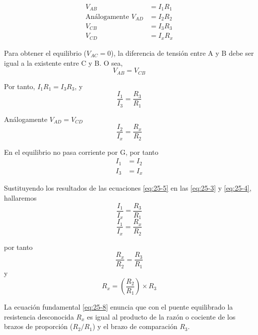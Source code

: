 \documentclass{article}
\numberwithin{equation}{subsection}
\numberwithin{figure}{section}
\numberwithin{table}{section}
\begin{document}
\begin{align}
    V_{AB} &= I_1 R_1 \nonumber \\
    \text{Análogamente } V_{AD} &= I_2 R_2 \label{eq:25-1} \\
    V_{CB} &= I_3 R_3 \nonumber \\
    V_{CD} &= I_x R_x \nonumber
\end{align}

Para obtener el equilibrio ($V_{AC} = 0$), la diferencia de tensión entre A y B debe ser igual a la existente 
entre C y B. O sea,
\begin{equation}
    V_{AB} = V_{CB} \label{eq:25-2}
\end{equation}

Por tanto, $I_1 R_1 = I_3 R_3$, y
\begin{equation}
    \frac{I_1}{I_3} = \frac{R_3}{R_1} \label{eq:25-3}
\end{equation}

Análogamente $V_{AD} = V_{CD}$
\begin{equation}
    \frac{I_2}{I_x} = \frac{R_x}{R_2} \label{eq:25-4}
\end{equation}

En el equilibrio no pasa corriente por G, por tanto
\begin{align}
    I_1 &= I_2 \label{eq:25-5} \\
    I_3 &= I_x \nonumber
\end{align}

Sustituyendo los resultados de las ecuaciones \eqref{eq:25-5} en las \eqref{eq:25-3} y \eqref{eq:25-4}, hallaremos
\begin{equation}
    \frac{I_1}{I_x} = \frac{R_3}{R_1} \label{eq:25-6}
\end{equation}
\begin{equation}
    \frac{I_1}{I_x} = \frac{R_x}{R_2} \nonumber
\end{equation}

por tanto
\begin{equation}
    \frac{R_x}{R_2} = \frac{R_3}{R_1} \label{eq:25-7}
\end{equation}
y
\begin{equation}
    R_x = \left( \frac{R_2}{R_1} \right) \times R_3 \label{eq:25-8}
\end{equation}

La ecuación fundamental \eqref{eq:25-8} enuncia que con el puente equilibrado la resistencia desconocida $R_x$ 
es igual al producto de la razón o cociente de los brazos de proporción ($R_2/R_1$) y el brazo de 
comparación $R_3$.
\end{document}
